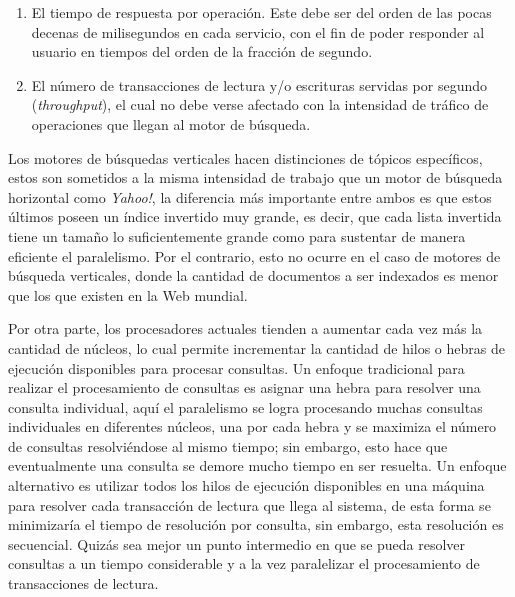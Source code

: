 \begin{enumerate}
  \item El tiempo de respuesta por operación. Este debe ser del orden de las pocas decenas de milisegundos en cada servicio, con el fin de poder responder al usuario en tiempos del orden de la fracción de segundo.
  \item El número de transacciones de lectura y/o escrituras servidas por segundo (\textit{throughput}), el cual no debe verse afectado con la intensidad de tráfico de operaciones que llegan al motor de búsqueda.
\end{enumerate}

Los motores de búsquedas verticales hacen distinciones de tópicos específicos, estos son sometidos a la misma intensidad de trabajo que un motor de búsqueda horizontal como \textit{Yahoo!}, la diferencia más importante entre ambos es que estos últimos poseen un índice invertido muy grande, es decir, que cada lista invertida tiene un tamaño lo suficientemente grande como para sustentar de manera eficiente el paralelismo. Por el contrario, esto no ocurre en el caso de motores de búsqueda verticales, donde la cantidad de documentos a ser indexados es menor que los que existen en la Web mundial.

Por otra parte, los procesadores actuales tienden a aumentar cada vez más la cantidad de núcleos, lo cual permite incrementar la cantidad de hilos o hebras de ejecución disponibles para procesar consultas. Un enfoque tradicional para realizar el procesamiento de consultas es asignar una hebra para resolver una consulta individual, aquí el paralelismo se logra procesando muchas consultas individuales en diferentes núcleos, una por cada hebra y se maximiza el número de consultas resolviéndose al mismo tiempo; sin embargo, esto hace que eventualmente una consulta se demore mucho tiempo en ser resuelta. Un enfoque alternativo es utilizar todos los hilos de ejecución disponibles en una máquina para resolver cada transacción de lectura que llega al sistema, de esta forma se minimizaría el tiempo de resolución por consulta, sin embargo, esta resolución es secuencial. Quizás sea mejor un punto intermedio en que se pueda resolver consultas a un tiempo considerable y a la vez paralelizar el procesamiento de transacciones de lectura.

